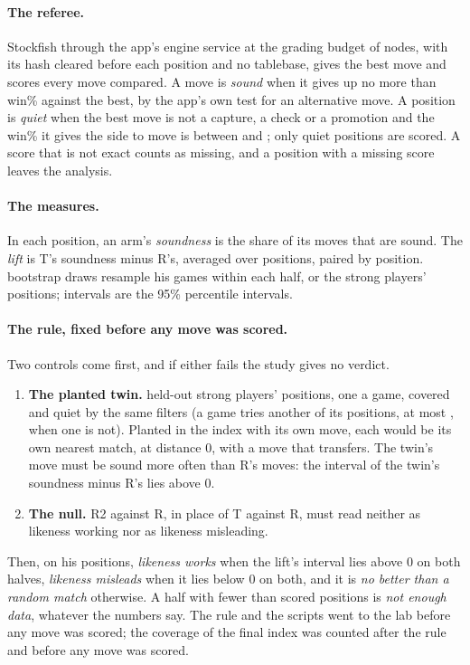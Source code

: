 \documentclass[11pt]{article}
\begin{document}
\paragraph{The referee.} Stockfish through the app's engine service at the grading budget of
\GradeNodes{} nodes, with its hash cleared before each position and no tablebase, gives the best
move and scores every move compared. A move is \emph{sound} when it gives up no more than
\Window{} win\% against the best, by the app's own test for an alternative move. A position is
\emph{quiet} when the best move is not a capture, a check or a promotion and the win\% it gives
the side to move is between \WinLow{} and \WinHigh; only quiet positions are scored. A score
that is not exact counts as missing, and a position with a missing score leaves the analysis.

\paragraph{The measures.} In each position, an arm's \emph{soundness} is the share of its \Arm{}
moves that are sound. The \emph{lift} is T's soundness minus R's, averaged over positions, paired
by position. \Draws{} bootstrap draws resample his games within each half, or the strong players'
positions; intervals are the 95\% percentile intervals.

\paragraph{The rule, fixed before any move was scored.} Two controls come first, and if either
fails the study gives no verdict.
\begin{enumerate}[nosep]
\item \textbf{The planted twin.} \StrongQueries{} held-out strong players' positions, one a game,
  covered and quiet by the same filters (a game tries another of its positions, at most \Tries,
  when one is not). Planted in the index with its own move, each would be its own nearest match,
  at distance 0, with a move that transfers. The twin's move must be sound more often than R's
  moves: the interval of the twin's soundness minus R's lies above 0.
\item \textbf{The null.} R2 against R, in place of T against R, must read neither as likeness
  working nor as likeness misleading.
\end{enumerate}
Then, on his positions, \emph{likeness works} when the lift's interval lies above 0 on both
halves, \emph{likeness misleads} when it lies below 0 on both, and it is \emph{no better than a
random match} otherwise. A half with fewer than \MinPositions{} scored positions is \emph{not
enough data}, whatever the numbers say. The rule and the scripts went to the lab before any move
was scored; the coverage of the final index was counted after the rule and before any move was
scored.
\end{document}
